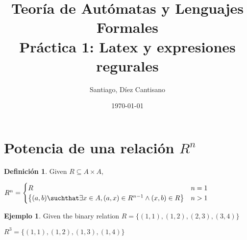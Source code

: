 \documentclass{article}
\title{Teoría de Autómatas y Lenguajes Formales\\[.4\baselineskip]Práctica 1: Latex y expresiones regurales}
\author{Santiago, Díez Cantisano}
\date{\today}
\theoremstyle{plain}
\theoremstyle{definition}
\newtheorem{definition}{Definición}[section]
\newtheorem{example}{Ejemplo}[section]
\begin{document}
\maketitle

\section{Potencia de una relación $R^n$}

\begin {definition}
Given $ R \subseteq A \times A $,

\begin{center}
$ R^n = \begin{cases}
R & n=1 \\
\left\{(a,b) \suchthat \exists x \in A, (a,x)\in R^{n-1}\wedge (x,b)\in R\right\} & n > 1

\end{cases}$
\end{center}

\end {definition}

\begin{example}
Given the binary relation $R = \{(1, 1), (1, 2), (2, 3),(3,4)\}$


\qquad $R^3 = \{(1, 1), (1, 2), (1, 3),(1,4)\}$


\end{example}
\end{document}
